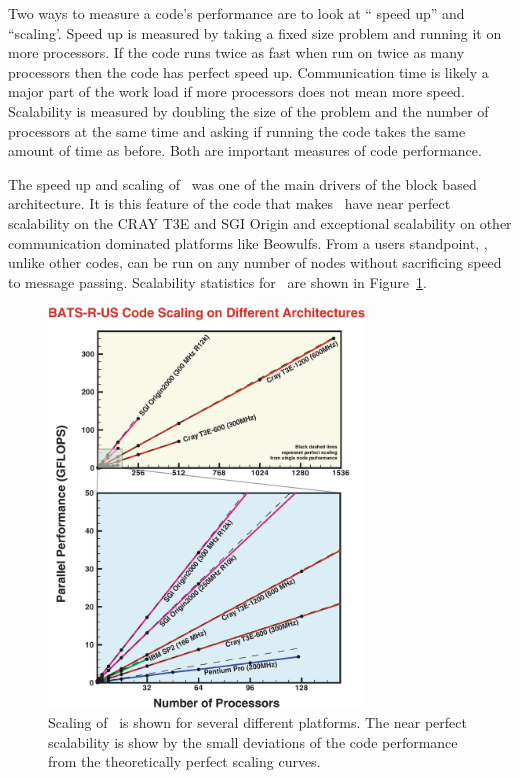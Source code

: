Two ways to measure a code's performance are to look at `` speed up'' and 
``scaling'.  Speed up is measured by taking a fixed size problem and running
it on more processors.  If the code runs twice as fast when run on twice as 
many processors then the code has perfect speed up.  Communication time is 
likely a major part of the work load if more processors does not mean
more speed.    
Scalability is measured by doubling the size of the problem and the number
of processors at the same time and asking if running the code takes the
same amount of time as before.  
Both are important measures of code performance.

The speed up and scaling of \BATSRUS\ was
one of the main drivers of the block based architecture.  It is this
feature of the code that makes \BATSRUS\ have near perfect scalability
on the CRAY T3E and SGI Origin and exceptional scalability on other
communication dominated platforms like Beowulfs.  From a users standpoint,
\BATSRUS, unlike other codes, can be run on any number of nodes without
sacrificing speed to message passing.  Scalability statistics for \BATSRUS\
are shown in
Figure~\ref{fig:scalability}.
\begin{figure}
\begin{center}
\includegraphics*[width=8.4cm]{NewScaling.eps}
\end{center}
\caption{Scaling of \BATSRUS\ is shown for several 
different platforms.  The 
near perfect scalability is show by the small deviations of the code performance
from the theoretically perfect scaling curves.}
\label{fig:scalability}
\end{figure}


